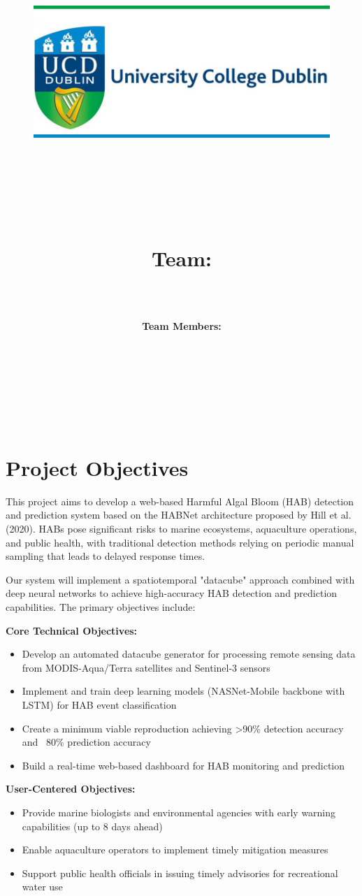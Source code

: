 \documentclass[12pt]{article}
\date{}
\title{
\vspace{-1in}
\begin{figure}[!ht]
\flushleft
\includegraphics[width=0.4\linewidth]{UCD.jpg}
\end{figure}
\vspace{-0.5cm}
\hrulefill \\
\vspace{0.5cm}
\textmd{\textbf{\moduleCode\ \moduleName}}\\
\textmd{\textbf{\assignmentTitle}}\\
\textmd{\textbf{Team: \teamName}}\\
\vspace{0.5cm}
\hrulefill \\
}
\author{
\textbf{Team Members:}\\
\memberOne\\
\memberTwo\\
\memberThree\\
\memberFour\\
\memberFive\\
\memberSix\\
}
\begin{document}
\lstset{language=Python, captionpos=b, frame=single}
\captionsetup{width=.8\linewidth} 

\maketitle
\tableofcontents
\vspace{0.5in}

\section{Project Objectives}

This project aims to develop a web-based Harmful Algal Bloom (HAB) detection and prediction system based on the HABNet architecture proposed by Hill et al. (2020). HABs pose significant risks to marine ecosystems, aquaculture operations, and public health, with traditional detection methods relying on periodic manual sampling that leads to delayed response times.

Our system will implement a spatiotemporal "datacube" approach combined with deep neural networks to achieve high-accuracy HAB detection and prediction capabilities. The primary objectives include:

\textbf{Core Technical Objectives:}
\begin{itemize}
    \item Develop an automated datacube generator for processing remote sensing data from MODIS-Aqua/Terra satellites and Sentinel-3 sensors
    \item Implement and train deep learning models (NASNet-Mobile backbone with LSTM) for HAB event classification
    \item Create a minimum viable reproduction achieving >90\% detection accuracy and ~80\% prediction accuracy
    \item Build a real-time web-based dashboard for HAB monitoring and prediction
\end{itemize}

\textbf{User-Centered Objectives:}
\begin{itemize}
    \item Provide marine biologists and environmental agencies with early warning capabilities (up to 8 days ahead)
    \item Enable aquaculture operators to implement timely mitigation measures
    \item Support public health officials in issuing timely advisories for recreational water use
\end{itemize}
\end{document}
